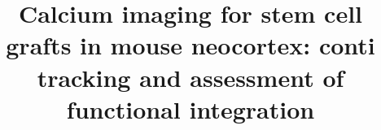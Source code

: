 \title{Calcium imaging for stem cell grafts in mouse neocortex: conti tracking and assessment of functional integration}